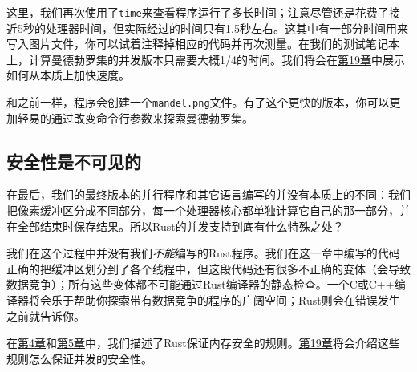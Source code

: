 这里，我们再次使用了\texttt{time}来查看程序运行了多长时间；注意尽管还是花费了接近5秒的处理器时间，但实际经过的时间只有1.5秒左右。这其中有一部分时间用来写入图片文件，你可以试着注释掉相应的代码并再次测量。在我们的测试笔记本上，计算曼德勃罗集的并发版本只需要大概1/4的时间。我们将会在\hyperref[ch19]{第19章}中展示如何从本质上加快速度。

和之前一样，程序会创建一个\texttt{mandel.png}文件。有了这个更快的版本，你可以更加轻易的通过改变命令行参数来探索曼德勃罗集。

\subsection{安全性是不可见的}

在最后，我们的最终版本的并行程序和其它语言编写的并没有本质上的不同：我们把像素缓冲区分成不同部分，每一个处理器核心都单独计算它自己的那一部分，并在全部结束时保存结果。所以Rust的并发支持到底有什么特殊之处？

我们在这个过程中并没有我们\emph{不能}编写的Rust程序。我们在这一章中编写的代码正确的把缓冲区划分到了各个线程中，但这段代码还有很多不正确的变体（会导致数据竞争）；所有这些变体都不可能通过Rust编译器的静态检查。一个C或C++编译器将会乐于帮助你探索带有数据竞争的程序的广阔空间；Rust则会在错误发生之前就告诉你。

在\hyperref[ch04]{第4章}和\hyperref[ch05]{第5章}中，我们描述了Rust保证内存安全的规则。\hyperref[ch19]{第19章}将会介绍这些规则怎么保证并发的安全性。


